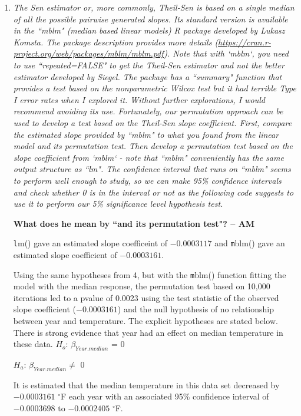 \documentclass[11pt]{article}\usepackage[]{graphicx}\usepackage[]{color}
\begin{document}
\begin{enumerate}
\item%
{\it The Sen estimator or, more commonly, Theil-Sen is based on a single median of all the possible pairwise generated slopes. Its standard version is available in the ``mblm" (median based linear models) R package developed by Lukasz Komsta. The package description provides more details (\url{https://cran.r-project.org/web/packages/mblm/mblm.pdf}). Note that with `mblm`, you need to use ``repeated=FALSE" to get the Theil-Sen estimator and not the better estimator developed by Siegel. The package has a ``summary" function that provides a test based on the nonparametric Wilcox test but it had terrible Type I error rates when I explored it. Without further explorations, I would recommend avoiding its use. Fortunately, our permutation approach can be used to develop a test based on the Theil-Sen slope coefficient. First, compare the estimated slope provided by ``mblm" to what you found from the linear model and its permutation test. Then develop a permutation test based on the slope coefficient from `mblm` - note that ``mblm" conveniently has the same output structure as ``lm". The confidence interval that runs on ``mblm" seems to perform well enough to study, so we can make 95\% confidence intervals and check whether 0 is in the interval or not as the following code suggests to use it to perform our 5\% significance level hypothesis test.}

{\bf What does he mean by ``and its permutation test"? -- AM}




{\texttt lm()} gave an estimated slope coefficeint of \ensuremath{-0.0003117} and {\texttt mblm()} gave an estimated slope coefficient of \ensuremath{-0.0003161}.

Using the same hypotheses from 4, but with the {\texttt mblm()} function fitting the model with the median response, the permutation test based on 10,000 iterations led to a pvalue of 0.0023 using the test statistic of the observed slope coefficient (\ensuremath{-0.0003161}) and the null hypothesis of no relationship between year and temperature. The explicit hypotheses are stated below. There is strong evidence that year had an effect on median temperature in these data. 
$H_{o}$: $\beta_{Year.median}$ = 0

$H_{a}$: $\beta_{Year.median} \neq$ 0

It is estimated that the median temperature in this data set decreased by \ensuremath{-0.0003161} $^\circ$F each year with an associated 95\% confidence interval of \ensuremath{-0.0003698} to \ensuremath{-0.0002405} $^\circ$F.


\end{enumerate}
\end{document}
